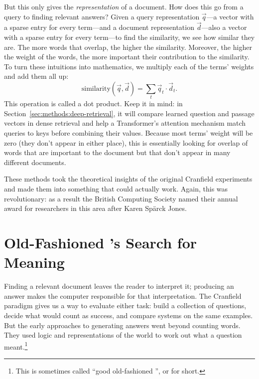 But this only gives the \emph{representation} of a document.
%
How does this go from a query to finding relevant answers?
%
Given a query representation $\vec q$---a vector with a sparse entry
for every term---and a document representation $\vec d$---also a
vector with a sparse entry for every term---to find the similarity, we
see how similar they are.
%
The more words that overlap, the higher the similarity.
%
Moreover, the higher the weight of the words, the more important their
contribution to the similarity.
%
To turn these intuitions into mathematics, we multiply each of the
terms' weights and add them all up:
\begin{equation}
  \mbox{similarity}(\vec q, \vec d) = \sum_t \vec q_t \cdot \vec d_t.
  \label{eq:ir:dot-product}
\end{equation}
This operation is called a dot product.  Keep it in mind: in
Section~\ref{sec:methods:deep-retrieval}, it will compare learned question
and passage vectors in dense retrieval and help a Transformer's attention
mechanism match queries to keys before combining their values.
%
Because most terms' weight will be zero (they don't appear in either place), this is essentially looking
for overlap of words that are important to the document but that don't
appear in many different documents.


These methods took the theoretical insights of the original
Cranfield experiments and made them into something that could actually
work.  Again, this was revolutionary: as a result the British
Computing Society named their annual award for researchers in this
area after Karen Sp\"arck Jones.

\section{Old-Fashioned 's Search for Meaning}
\label{sec:ir:gofai-qa}

Finding a relevant document leaves the reader to interpret it; producing
an answer makes the computer responsible for that interpretation.
%
The Cranfield paradigm gives us a way to evaluate either task: build a
collection of questions, decide what would count as success, and compare
systems on the same examples.
%
But the early approaches to generating answers went beyond counting
words.  They used logic and representations of the world to work out
what a question meant.\footnote{This is sometimes called ``good old-fashioned
  '', or  for short.}

